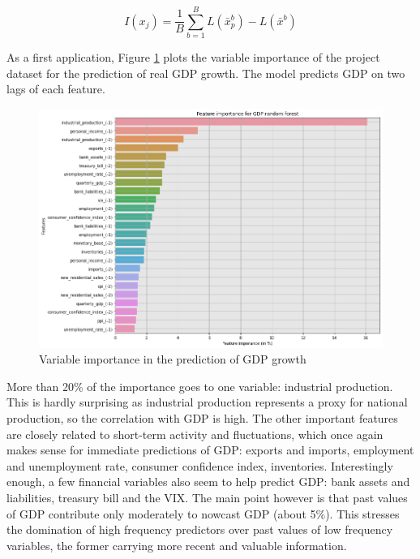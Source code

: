 \begin{equation}
I(x_j) = \frac{1}{B} \sum_{b=1}^{B}{L(\bar{x}_p^b) - L(\bar{x}^b)}
\label{equation_c3_s8_ss4_1} 
\end{equation}

As a first application, Figure \ref{fig_c3_s8_ss4_1} plots the variable importance of the project dataset for the prediction of real GDP growth. The model predicts GDP on two lags of each feature.

\begin{figure}[H]
\centering
\includegraphics[scale=0.5]{images/variable_importance.png}
\caption{Variable importance in the prediction of GDP growth}
\label{fig_c3_s8_ss4_1} \vspace{-3mm}
\end{figure}

More than 20\% of the importance goes to one variable: industrial production. This is hardly surprising as industrial production represents a proxy for national production, so the correlation with GDP is high. The other important features are closely related to short-term activity and fluctuations, which once again makes sense for immediate predictions of GDP: exports and imports, employment and unemployment rate, consumer confidence index, inventories. Interestingly enough, a few financial variables also seem to help predict GDP: bank assets and liabilities, treasury bill and the VIX. The main point however is that past values of GDP contribute only moderately to nowcast GDP (about 5\%). This stresses the domination of high frequency predictors over past values of low frequency variables, the former carrying more recent and valuable information.

